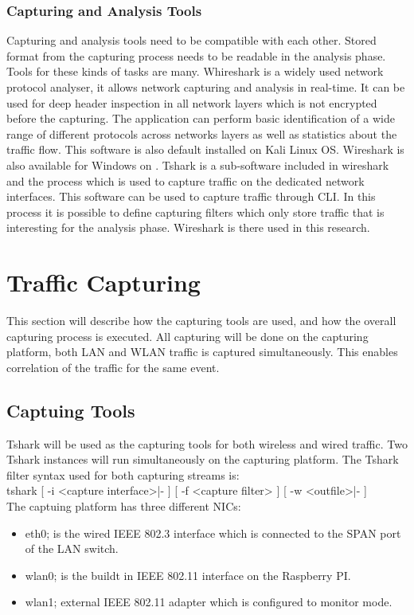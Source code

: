 \subsubsection{Capturing and Analysis Tools}
Capturing and analysis tools need to be compatible with each other. Stored format from the capturing process needs to be readable in the analysis phase. Tools for these kinds of tasks are many. Whireshark is a widely used network protocol analyser, it allows network capturing and analysis in real-time. It can be used for deep header inspection in all network layers which is not encrypted before the capturing. The application can perform basic identification of a wide range of different protocols across networks layers as well as statistics about the traffic flow. This software is also default installed on Kali Linux OS. Wireshark is also available for Windows on \cite{wireshark_download_2016}.
Tshark is a sub-software included in wireshark and the process which is used to capture traffic on the dedicated network interfaces. This software can be used to capture traffic through CLI. In this process it is possible to define capturing filters which only store traffic that is interesting for the analysis phase. Wireshark is there used in this research.


\section{Traffic Capturing}
This section will describe how the capturing tools are used, and how the overall capturing process is executed. All capturing will be done on the capturing platform, both LAN and WLAN traffic is captured simultaneously. This enables correlation of the traffic for the same event.  

\subsection{Captuing Tools}
Tshark will be used as the capturing tools for both wireless and wired traffic. Two Tshark instances will run simultaneously on the capturing platform. The Tshark filter syntax used for both capturing streams is: 
\\
tshark [ -i <capture interface>|- ] [ -f <capture filter> ] [ -w <outfile>|- ]
\\
The captuing platform has three different NICs:
\begin{itemize}
    \item eth0; is the wired IEEE 802.3 interface which is connected to the SPAN port of the LAN switch.
    \item wlan0; is the buildt in IEEE 802.11 interface on the Raspberry PI.
    \item wlan1; external IEEE 802.11 adapter which is configured to monitor mode.
\end{itemize}

